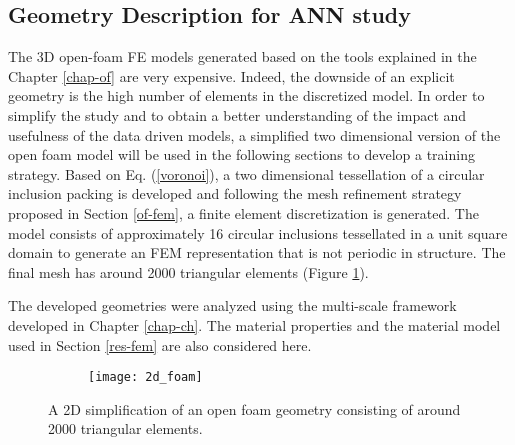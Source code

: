 \subsection{Geometry Description for ANN study}\label{app-geom}
The 3D open-foam FE models generated based on the tools explained in the Chapter \ref{chap-of} are very expensive. Indeed, the downside of an explicit geometry is the high number of elements in the discretized model. In order to simplify the study and to obtain a better understanding of the impact and usefulness of the data driven models, a simplified two dimensional version of the open foam model will be used in the following sections to develop a training strategy. Based on Eq. (\ref{voronoi}), a two dimensional tessellation of a circular inclusion packing is developed and following the mesh refinement strategy proposed in Section \ref{of-fem}, a finite element discretization is generated. The model consists of approximately 16 circular inclusions tessellated in a unit square domain to generate an FEM representation that is not periodic in structure. The final mesh has around 2000 triangular elements (Figure \ref{fig-nn-model}).

The developed geometries were analyzed using the multi-scale framework developed in Chapter \ref{chap-ch}. The material properties and the material model used in Section \ref{res-fem} are also considered here.

\begin{figure}
	\centering
	\begin{subfigure}[t]{0.45\textwidth}
		\texttt{[image: 2d\_foam]}
		\caption{}
	\end{subfigure}
	\caption{A 2D simplification of an open foam geometry consisting of around 2000 triangular elements.
	}\label{fig-nn-model}
\end{figure}


